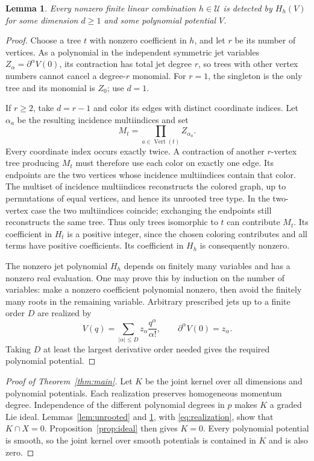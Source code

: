 \documentclass[11pt]{article}
\newtheorem{lemma}[theorem]{Lemma}
\begin{document}
\begin{lemma}\label{lem:jets}
Every nonzero finite linear combination $h\in\mathcal U$ is detected by
$H_h(V)$ for some dimension $d\ge1$ and some polynomial potential $V$.
\end{lemma}
\begin{proof}
Choose a tree $t$ with nonzero coefficient in $h$, and let $r$ be its number
of vertices. As a polynomial in the independent symmetric jet variables
$Z_\alpha=\partial^\alpha V(0)$, its contraction has total jet degree $r$,
so trees with other vertex numbers cannot cancel a degree-$r$ monomial.
For $r=1$, the singleton is the only tree and its monomial is $Z_0$; use $d=1$.

If $r\ge2$, take $d=r-1$ and color its edges with distinct coordinate
indices. Let $\alpha_a$ be the resulting incidence multiindices and set
\[
 M_t=\prod_{a\in\operatorname{Vert}(t)}Z_{\alpha_a}.
\]
Every coordinate index occurs exactly twice. A contraction of another
$r$-vertex tree producing $M_t$ must therefore use each color on exactly one
edge. Its endpoints are the two vertices whose incidence multiindices
contain that color. The multiset of incidence multiindices reconstructs the
colored graph, up to permutations of equal vertices, and hence its unrooted
tree type. In the two-vertex case the two multiindices coincide; exchanging
the endpoints still reconstructs the same tree. Thus only trees isomorphic
to $t$ can contribute $M_t$. Its coefficient in $H_t$ is a positive integer,
since the chosen coloring contributes and all terms have positive coefficients.
Its coefficient in $H_h$ is consequently nonzero.

The nonzero jet polynomial $H_h$ depends on finitely many variables and has
a nonzero real evaluation. One may prove this by induction on the number
of variables: make a nonzero coefficient polynomial nonzero, then avoid
the finitely many roots in the remaining variable.
Arbitrary prescribed jets up to a finite order $D$ are realized by
\[
 V(q)=\sum_{|\alpha|\le D} z_\alpha\frac{q^\alpha}{\alpha!},
 \qquad\partial^\alpha V(0)=z_\alpha.
\]
Taking $D$ at least the largest derivative order needed gives the required
polynomial potential.
\end{proof}

\begin{proof}[Proof of Theorem~\ref{thm:main}]
Let $K$ be the joint kernel over all dimensions and polynomial potentials.
Each realization preserves homogeneous momentum degree. Independence of the
different polynomial degrees in $p$ makes $K$ a graded Lie ideal.
Lemmas~\ref{lem:unrooted} and \ref{lem:jets}, with
\eqref{eq:realization}, show that $K\cap X=0$.
Proposition~\ref{prop:ideal} then gives $K=0$.
Every polynomial potential is smooth, so the joint kernel over smooth
potentials is contained in $K$ and is also zero.
\end{proof}
\end{document}
